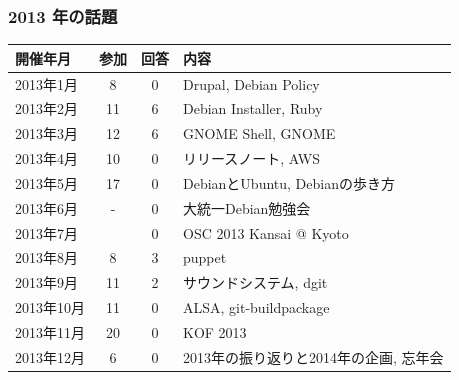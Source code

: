 \documentclass[cjk,dvipdfmx,10pt,compress,%
hyperref={bookmarks=true,bookmarksnumbered=true,bookmarksopen=false,%
colorlinks=false,%
pdftitle={第 121 回 関西 Debian 勉強会},%
pdfauthor={倉敷・のがた・佐々木・かわだ},%
pdfsubject={資料},%
}]{beamer}
\begin{document}
\begin{frame}[fragile]
  \frametitle{2013 年の話題}
    \begin{table}
        \begin{center}
          \begin{tabular}{|l|c|c|p{20em}|}
            \hline
            開催年月  & 参加 & 回答 & 内容 \\
            \hline
            2013年1月 & 8    &0     & Drupal, Debian Policy \\
            2013年2月 &11    &6     & Debian Installer, Ruby \\
            2013年3月 &12    &6     & GNOME Shell, GNOME \\
            2013年4月 &10    &0     & リリースノート, AWS \\
            2013年5月 &17    &0     & DebianとUbuntu, Debianの歩き方 \\
            2013年6月 & -    &0     & 大統一Debian勉強会 \\
            2013年7月 &      &0     & OSC 2013 Kansai @ Kyoto\\
            2013年8月 & 8    &3     & puppet \\
            2013年9月 &11    &2     & サウンドシステム, dgit \\
            2013年10月&11    &0     & ALSA, git-buildpackage \\
            2013年11月&20    &0     & KOF 2013 \\
            2013年12月& 6    &0     & 2013年の振り返りと2014年の企画, 忘年会 \\
            \hline
          \end{tabular}
        \end{center}
    \end{table}
\end{frame}
\end{document}
